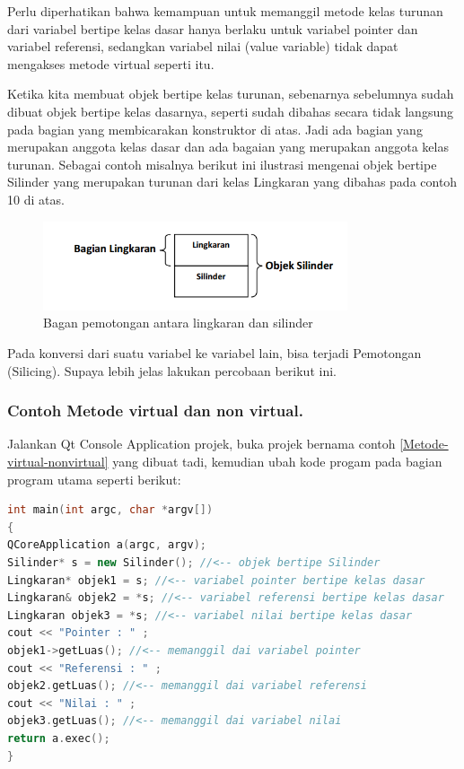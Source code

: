 Perlu diperhatikan bahwa kemampuan untuk memanggil metode kelas turunan
dari variabel bertipe kelas dasar hanya berlaku untuk variabel pointer
dan variabel referensi, sedangkan variabel nilai (value variable) tidak
dapat mengakses metode virtual seperti itu.

Ketika kita membuat objek bertipe kelas turunan, sebenarnya sebelumnya
sudah dibuat objek bertipe kelas dasarnya, seperti sudah dibahas secara
tidak langsung pada bagian yang membicarakan konstruktor di atas. Jadi
ada bagian yang merupakan anggota kelas dasar dan ada bagaian yang
merupakan anggota kelas turunan. Sebagai contoh misalnya berikut ini
ilustrasi mengenai objek bertipe Silinder yang merupakan turunan dari
kelas Lingkaran yang dibahas pada contoh 10 di atas.

\begin{figure}[htbp]
\centering
\includegraphics[width=0.8\textwidth]{images/capture7-6.png}
\caption{Bagan pemotongan antara lingkaran dan silinder}
\end{figure}

Pada konversi dari suatu variabel ke variabel lain, bisa terjadi
Pemotongan (Silicing). Supaya lebih jelas lakukan percobaan berikut ini.

\subsubsection*{Contoh  Metode virtual dan non virtual.}

Jalankan Qt Console Application projek, buka projek bernama contoh \ref{Metode-virtual-nonvirtual}
yang dibuat tadi, kemudian ubah kode progam pada bagian program utama
seperti berikut:



\begin{lstlisting}[language=c++, caption=Metode virtual dan non virtual]
int main(int argc, char *argv[])
{
QCoreApplication a(argc, argv);
Silinder* s = new Silinder(); //<-- objek bertipe Silinder
Lingkaran* objek1 = s; //<-- variabel pointer bertipe kelas dasar
Lingkaran& objek2 = *s; //<-- variabel referensi bertipe kelas dasar
Lingkaran objek3 = *s; //<-- variabel nilai bertipe kelas dasar
cout << "Pointer : " ;
objek1->getLuas(); //<-- memanggil dai variabel pointer
cout << "Referensi : " ;
objek2.getLuas(); //<-- memanggil dai variabel referensi
cout << "Nilai : " ;
objek3.getLuas(); //<-- memanggil dai variabel nilai
return a.exec();
}
\end{lstlisting}

